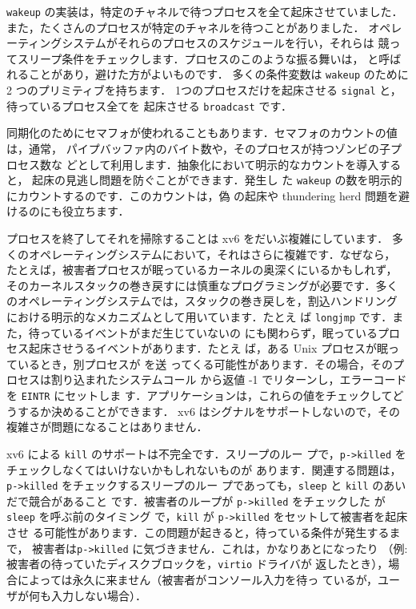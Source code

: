 \texttt{wakeup} の実装は，特定のチャネルで待つプロセスを全て起床させていました．
また，たくさんのプロセスが特定のチャネルを待つことがありました．
オペレーティングシステムがそれらのプロセスのスケジュールを行い，それらは
競ってスリープ条件をチェックします．プロセスのこのような振る舞いは，
 と呼ばれることがあり，避けた方がよいものです．
多くの条件変数は \texttt{wakeup} のために 2 つのプリミティブを持ちます．
1つのプロセスだけを起床させる \texttt{signal} と，待っているプロセス全てを
起床させる \texttt{broadcast} です．

同期化のためにセマフォが使われることもあります．セマフォのカウントの値は，通常，
パイプバッファ内のバイト数や，そのプロセスが持つゾンビの子プロセス数な
どとして利用します．抽象化において明示的なカウントを導入すると，
起床の見逃し問題を防ぐことができます．発生し
た \texttt{wakeup} の数を明示的にカウントするのです．このカウントは，偽
の起床や thundering herd 問題を避けるのにも役立ちます．

プロセスを終了してそれを掃除することは xv6 をだいぶ複雑にしています．
多くのオペレーティングシステムにおいて，それはさらに複雑です．なぜなら，
たとえば，被害者プロセスが眠っているカーネルの奥深くにいるかもしれず，
そのカーネルスタックの巻き戻すには慎重なプログラミングが必要です．多く
のオペレーティングシステムでは，スタックの巻き戻しを，割込ハンドリング
における明示的なメカニズムとして用いています．たとえ
ば \texttt{longjmp} です．また，待っているイベントがまだ生じていないの
にも関わらず，眠っているプロセス起床させうるイベントがあります．たとえ
ば，ある Unix プロセスが眠っているとき，別プロセスが  を送
ってくる可能性があります．その場合，そのプロセスは割り込まれたシステムコール
から返値 -1 でリターンし，エラーコードを \texttt{EINTR} にセットしま
す．アプリケーションは，これらの値をチェックしてどうするか決めることができます．
xv6 はシグナルをサポートしないので，その複雑さが問題になることはありません．

xv6 による \texttt{kill} のサポートは不完全です．スリープのルー
プで，\texttt{p->killed} をチェックしなくてはいけないかもしれないものが
あります．関連する問題は，\texttt{p->killed} をチェックするスリープのルー
プであっても，\texttt{sleep} と \texttt{kill} のあいだで競合があること
です．被害者のループが \texttt{p->killed} をチェックした
が \texttt{sleep} を呼ぶ前のタイミング
で，\texttt{kill} が \texttt{p->killed} をセットして被害者を起床させ
る可能性があります．この問題が起きると，待っている条件が発生するまで，
被害者は\texttt{p->killed} に気づきません．これは，かなりあとになったり
（例: 被害者の待っていたディスクブロックを，\texttt{virtio} ドライバが
返したとき），場合によっては永久に来ません（被害者がコンソール入力を待っ
ているが，ユーザが何も入力しない場合）．

